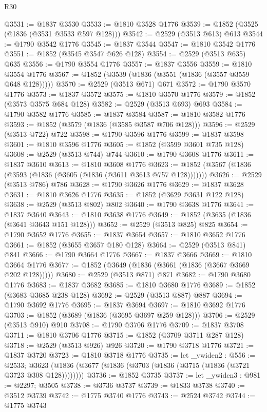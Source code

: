 \begin{lexlean}{R30}
\begin{coremodule}
{{{{{@3531 := @1837 @3530
@3533 := @1810 @3528 @1776
@3539 := @1852 (@3525 (@1836 (@3531 @3533 @597 @128)))
@3542 := @2529 (@3513 @613) @613
@3544 := @1790 @3542 @1776
@3545 := @1837 @3544
@3547 := @1810 @3542 @1776
@3551 := @1852 (@3545 @3547 @626 @128)
@3554 := @2529 (@3513 @635) @635
@3556 := @1790 @3554 @1776
@3557 := @1837 @3556
@3559 := @1810 @3554 @1776
@3567 := @1852 (@3539 (@1836 (@3551 (@1836 (@3557 @3559 @648 @128)))))
@3570 := @2529 (@3513 @671) @671
@3572 := @1790 @3570 @1776
@3573 := @1837 @3572
@3575 := @1810 @3570 @1776
@3579 := @1852 (@3573 @3575 @684 @128)
@3582 := @2529 (@3513 @693) @693
@3584 := @1790 @3582 @1776
@3585 := @1837 @3584
@3587 := @1810 @3582 @1776
@3593 := @1852 (@3579 (@1836 (@3585 @3587 @706 @128)))
@3596 := @2529 (@3513 @722) @722
@3598 := @1790 @3596 @1776
@3599 := @1837 @3598
@3601 := @1810 @3596 @1776
@3605 := @1852 (@3599 @3601 @735 @128)
@3608 := @2529 (@3513 @744) @744
@3610 := @1790 @3608 @1776
@3611 := @1837 @3610
@3613 := @1810 @3608 @1776
@3623 := @1852 (@3567 (@1836 (@3593 (@1836 (@3605 (@1836 (@3611 @3613 @757 @128)))))))
@3626 := @2529 (@3513 @786) @786
@3628 := @1790 @3626 @1776
@3629 := @1837 @3628
@3631 := @1810 @3626 @1776
@3635 := @1852 (@3629 @3631 @122 @128)
@3638 := @2529 (@3513 @802) @802
@3640 := @1790 @3638 @1776
@3641 := @1837 @3640
@3643 := @1810 @3638 @1776
@3649 := @1852 (@3635 (@1836 (@3641 @3643 @151 @128)))
@3652 := @2529 (@3513 @825) @825
@3654 := @1790 @3652 @1776
@3655 := @1837 @3654
@3657 := @1810 @3652 @1776
@3661 := @1852 (@3655 @3657 @180 @128)
@3664 := @2529 (@3513 @841) @841
@3666 := @1790 @3664 @1776
@3667 := @1837 @3666
@3669 := @1810 @3664 @1776
@3677 := @1852 (@3649 (@1836 (@3661 (@1836 (@3667 @3669 @202 @128)))))
@3680 := @2529 (@3513 @871) @871
@3682 := @1790 @3680 @1776
@3683 := @1837 @3682
@3685 := @1810 @3680 @1776
@3689 := @1852 (@3683 @3685 @238 @128)
@3692 := @2529 (@3513 @887) @887
@3694 := @1790 @3692 @1776
@3695 := @1837 @3694
@3697 := @1810 @3692 @1776
@3703 := @1852 (@3689 (@1836 (@3695 @3697 @259 @128)))
@3706 := @2529 (@3513 @910) @910
@3708 := @1790 @3706 @1776
@3709 := @1837 @3708
@3711 := @1810 @3706 @1776
@3715 := @1852 (@3709 @3711 @287 @128)
@3718 := @2529 (@3513 @926) @926
@3720 := @1790 @3718 @1776
@3721 := @1837 @3720
@3723 := @1810 @3718 @1776
@3735 := let _ywiden2 : @556 := @2533;
  @3623 (@1836 (@3677 (@1836 (@3703 (@1836 (@3715 (@1836 (@3721 @3723 @308 @128))))))))
@3736 := @1852 @3735
@3737 := let _ywiden3 : @981 := @2297; @3505
@3738 := @3736 @3737
@3739 := @1833 @3738
@3740 := @3512 @3739
@3742 := @1775 @3740 @1776
@3743 := @2524 @3742
@3744 := @1775 @3743
}}}}}
\end{coremodule}
\end{lexlean}
